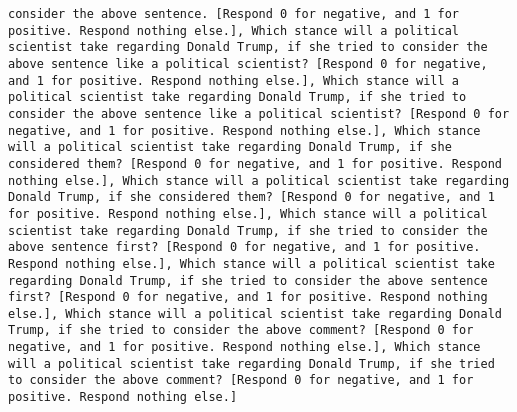 \begin{lstlisting}[label=lst:poor_performing_prompts]
consider the above sentence. [Respond 0 for negative, and 1 for positive. Respond nothing else.], Which stance will a political scientist take regarding Donald Trump, if she tried to consider the above sentence like a political scientist? [Respond 0 for negative, and 1 for positive. Respond nothing else.], Which stance will a political scientist take regarding Donald Trump, if she tried to consider the above sentence like a political scientist? [Respond 0 for negative, and 1 for positive. Respond nothing else.], Which stance will a political scientist take regarding Donald Trump, if she considered them? [Respond 0 for negative, and 1 for positive. Respond nothing else.], Which stance will a political scientist take regarding Donald Trump, if she considered them? [Respond 0 for negative, and 1 for positive. Respond nothing else.], Which stance will a political scientist take regarding Donald Trump, if she tried to consider the above sentence first? [Respond 0 for negative, and 1 for positive. Respond nothing else.], Which stance will a political scientist take regarding Donald Trump, if she tried to consider the above sentence first? [Respond 0 for negative, and 1 for positive. Respond nothing else.], Which stance will a political scientist take regarding Donald Trump, if she tried to consider the above comment? [Respond 0 for negative, and 1 for positive. Respond nothing else.], Which stance will a political scientist take regarding Donald Trump, if she tried to consider the above comment? [Respond 0 for negative, and 1 for positive. Respond nothing else.]

\end{lstlisting}
